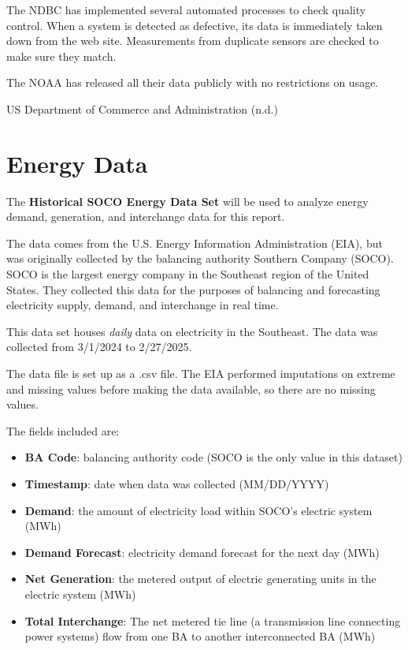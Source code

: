 \documentclass[
  letterpaper,
  DIV=11,
  numbers=noendperiod]{scrreprt}
\providecommand{\tightlist}{%
  \setlength{\itemsep}{0pt}\setlength{\parskip}{0pt}}\usepackage{longtable,booktabs,array}
\begin{document}
The NDBC has implemented several automated processes to check quality
control. When a system is detected as defective, its data is immediately
taken down from the web site. Measurements from duplicate sensors are
checked to make sure they match.

The NOAA has released all their data publicly with no restrictions on
usage.

US Department of Commerce and Administration (n.d.)

\hypertarget{energy-data}{%
\section{Energy Data}\label{energy-data}}

The \textbf{Historical SOCO Energy Data Set} will be used to analyze
energy demand, generation, and interchange data for this report.

The data comes from the U.S. Energy Information Administration (EIA),
but was originally collected by the balancing authority Southern Company
(SOCO). SOCO is the largest energy company in the Southeast region of
the United States. They collected this data for the purposes of
balancing and forecasting electricity supply, demand, and interchange in
real time.

This data set houses \emph{daily} data on electricity in the Southeast.
The data was collected from 3/1/2024 to 2/27/2025.

The data file is set up as a .csv file. The EIA performed imputations on
extreme and missing values before making the data available, so there
are no missing values.

The fields included are:

\begin{itemize}
\tightlist
\item
  \textbf{BA Code}: balancing authority code (SOCO is the only value in
  this dataset)
\item
  \textbf{Timestamp}: date when data was collected (MM/DD/YYYY)
\item
  \textbf{Demand}: the amount of electricity load within SOCO's electric
  system (MWh)
\item
  \textbf{Demand Forecast}: electricity demand forecast for the next day
  (MWh)
\item
  \textbf{Net Generation}: the metered output of electric generating
  units in the electric system (MWh)
\item
  \textbf{Total Interchange}: The net metered tie line (a transmission
  line connecting power systems) flow from one BA to another
  interconnected BA (MWh)
\end{itemize}
\end{document}
